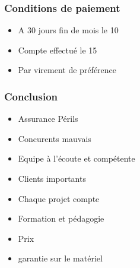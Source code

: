 \documentclass{beamer}
\begin{document}
\begin{frame}\frametitle{Conditions de paiement}
\begin {itemize}
\item A 30 jours fin de mois le 10
\item Compte effectué le 15
\item Par virement de préférence
\end {itemize}
\end{frame}


\begin{frame}\frametitle{Conclusion}

\begin {itemize}
\item Assurance Périls
\item Concurents mauvais
\item Equipe à l'écoute et compétente
\item Clients importants
\item Chaque projet compte
\item Formation et pédagogie
\item Prix
\item garantie sur le matériel

\end {itemize}

\end{frame}
\end{document}
